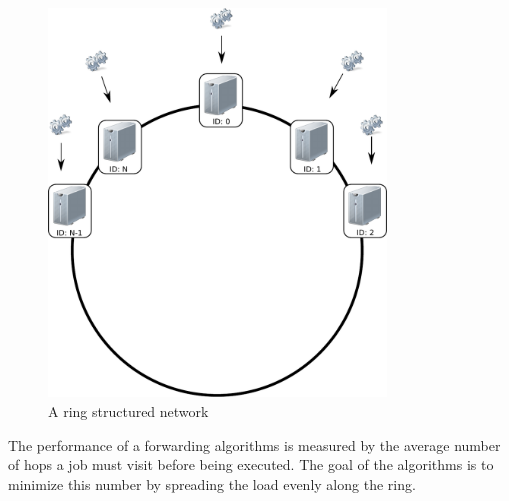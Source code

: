 \documentclass[10pt,a4paper,titlepage]{article}
\begin{document}
\begin{figure}[h!tb]
\centering
\includegraphics[width=0.8\textwidth,clip=true,trim=0px 225px 0px 0px]{resources/ring.pdf}
\caption{A ring structured network}
\label{figring}
\end{figure}

The performance of a forwarding algorithms is measured by the average number of hops a job must visit before being executed. The goal of the algorithms is to minimize this number by spreading the load evenly along the ring. 


%
\end{document}
